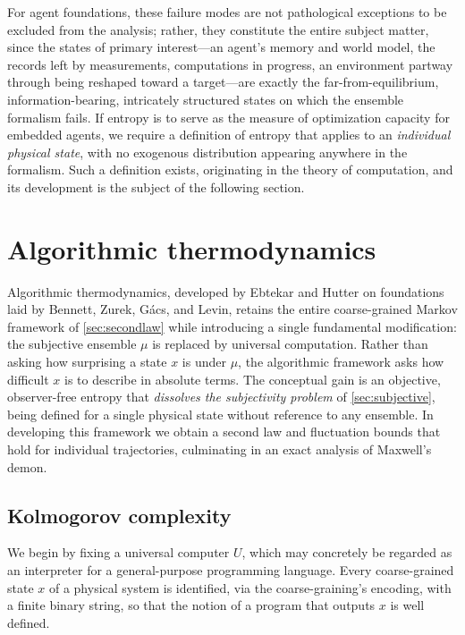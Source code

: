 \documentclass[11pt]{article}
\begin{document}
For agent foundations, these failure modes are not pathological exceptions to be excluded from the analysis; rather, they constitute the entire subject matter, since the states of primary interest---an agent's memory and world model, the records left by measurements, computations in progress, an environment partway through being reshaped toward a target---are exactly the far-from-equilibrium, information-bearing, intricately structured states on which the ensemble formalism fails. If entropy is to serve as the measure of optimization capacity for embedded agents, we require a definition of entropy that applies to an \emph{individual physical state}, with no exogenous distribution appearing anywhere in the formalism. Such a definition exists, originating in the theory of computation, and its development is the subject of the following section.
\section{Algorithmic thermodynamics}
\label{sec:algo}

Algorithmic thermodynamics, developed by Ebtekar and Hutter on foundations laid by Bennett, Zurek, G\'acs, and Levin, retains the entire coarse-grained Markov framework of \cref{sec:secondlaw} while introducing a single fundamental modification: the subjective ensemble $\mu$ is replaced by universal computation. Rather than asking how surprising a state $x$ is under $\mu$, the algorithmic framework asks how difficult $x$ is to describe in absolute terms. The conceptual gain is an objective, observer-free entropy that \emph{dissolves the subjectivity problem} of \cref{sec:subjective}, being defined for a single physical state without reference to any ensemble. In developing this framework we obtain a second law and fluctuation bounds that hold for individual trajectories, culminating in an exact analysis of Maxwell's demon.

\subsection{Kolmogorov complexity}
\label{sec:kolmogorov}

We begin by fixing a universal computer $U$, which may concretely be regarded as an interpreter for a general-purpose programming language. Every coarse-grained state $x$ of a physical system is identified, via the coarse-graining's encoding, with a finite binary string, so that the notion of a program that outputs $x$ is well defined.
\end{document}
